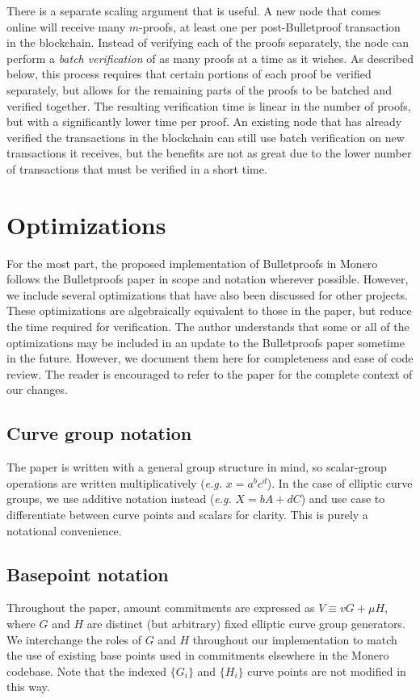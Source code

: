 \documentclass{mrl}
\begin{document}
There is a separate scaling argument that is useful. A new node that comes online will receive many $m$-proofs, at least one per post-Bulletproof transaction in the blockchain. Instead of verifying each of the proofs separately, the node can perform a \textit{batch verification} of as many proofs at a time as it wishes. As described below, this process requires that certain portions of each proof be verified separately, but allows for the remaining parts of the proofs to be batched and verified together. The resulting verification time is linear in the number of proofs, but with a significantly lower time per proof. An existing node that has already verified the transactions in the blockchain can still use batch verification on new transactions it receives, but the benefits are not as great due to the lower number of transactions that must be verified in a short time.

\section{Optimizations}
For the most part, the proposed implementation of Bulletproofs in Monero follows the Bulletproofs paper in scope and notation wherever possible. However, we include several optimizations that have also been discussed for other projects. These optimizations are algebraically equivalent to those in the paper, but reduce the time required for verification. The author understands that some or all of the optimizations may be included in an update to the Bulletproofs paper sometime in the future. However, we document them here for completeness and ease of code review. The reader is encouraged to refer to the paper for the complete context of our changes.

\subsection{Curve group notation}
The paper is written with a general group structure in mind, so scalar-group operations are written multiplicatively (\textit{e.g.} $x = a^bc^d$). In the case of elliptic curve groups, we use additive notation instead (\textit{e.g.} $X = bA + dC$) and use case to differentiate between curve points and scalars for clarity. This is purely a notational convenience.

\subsection{Basepoint notation}
Throughout the paper, amount commitments are expressed as $V \equiv vG + \mu H$, where $G$ and $H$ are distinct (but arbitrary) fixed elliptic curve group generators. We interchange the roles of $G$ and $H$ throughout our implementation to match the use of existing base points used in commitments elsewhere in the Monero codebase. Note that the indexed $\{G_i\}$ and $\{H_i\}$ curve points are not modified in this way.
\end{document}
